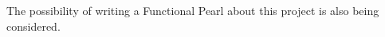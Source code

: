 \documentclass[
  oneside,
  11pt, a4paper,
  footinclude=true,
  headinclude=true,
  cleardoublepage=empty
]{scrbook}
\theoremstyle{definition}
\theoremstyle{definition}
\begin{document}
	 The possibility of writing a Functional Pearl about this project is also being considered.
	 
	
\end{document}
